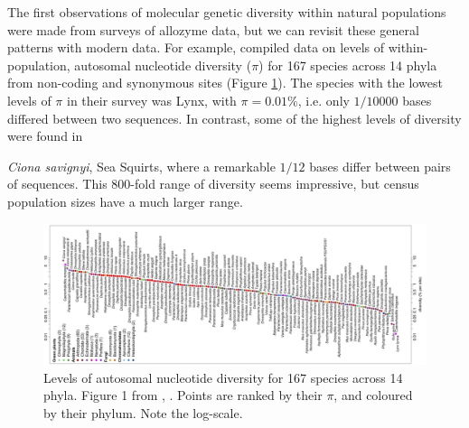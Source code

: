 {The first observations of molecular genetic diversity within natural populations were made from surveys of allozyme data, but we can revisit these general patterns with modern data. For
example, \citet{leffler:12} compiled data on levels of within-population,
autosomal nucleotide diversity ($\pi$) for 167 species across 14 phyla from
non-coding and synonymous sites (Figure \ref{fig:Leffer}). The species with the lowest levels of
$\pi$ in their survey was Lynx, with $\pi = 0.01\%$, i.e. only
$1/10000$ bases differed between two sequences. In contrast, some of the highest levels of
diversity were found in {\textit{Ciona savignyi}, Sea Squirts, where a remarkable
$1/12$ bases differ between pairs of sequences. This $800$-fold range of
diversity seems impressive, but census population sizes have a much
larger range.
\begin{figure}
\begin{center}
\includegraphics[width= \textwidth]{Journal_figs/alleles_genotypes/Leffer_riddle/Leffer_riddle_diversity.png}
\end{center}
\caption{Levels of autosomal nucleotide diversity for 167
species across 14 phyla. Figure 1 from \citet{leffler:12}, \PLOSccBY. Points are
ranked by their $\pi$, and coloured by their phylum. Note the log-scale.} \label{fig:Leffer}
\end{figure}

}}
